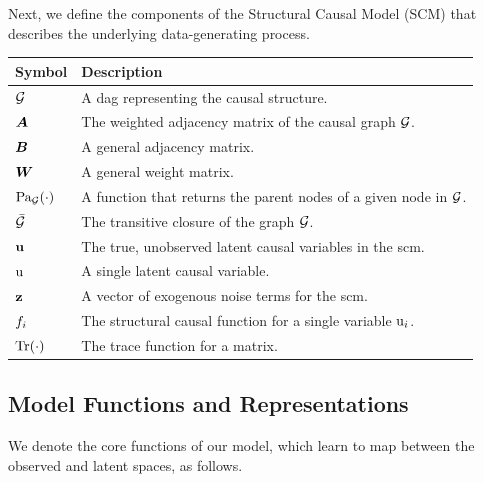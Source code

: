 Next, we define the components of the Structural Causal Model (SCM) that describes the underlying data-generating process.

\begin{table}[H]
\begin{tabularx}{\textwidth}{l X}
\toprule
\textbf{Symbol} & \textbf{Description} \\
\midrule
${\mathcal{G}}$ & A \gls{dag} representing the causal structure. \\
${\bm{A}}$ & The weighted adjacency matrix of the causal graph ${\mathcal{G}}$. \\
${\bm{B}}$ & A general adjacency matrix. \\
${\bm{W}}$ & A general weight matrix. \\
$\operatorname{Pa_{{\mathcal{G}}}}(\cdot)$ & A function that returns the parent nodes of a given node in ${\mathcal{G}}$. \\
$\bar{{\mathcal{G}}}$ & The transitive closure of the graph ${\mathcal{G}}$. \\
${\mathbf{u}}$ & The true, unobserved latent causal variables in the \gls{scm}. \\
${\textnormal{u}}$ & A single latent causal variable. \\
${\mathbf{z}}$ & A vector of exogenous noise terms for the \gls{scm}. \\
$f_i$ & The structural causal function for a single variable ${\textnormal{u}}_i$. \\
$\operatorname{Tr}(\cdot)$ & The trace function for a matrix. \\
\bottomrule
\end{tabularx}
\end{table}

\subsection{Model Functions and Representations}
\label{app:nomenclature:model_functions}

We denote the core functions of our model, which learn to map between the observed and latent spaces, as follows.

